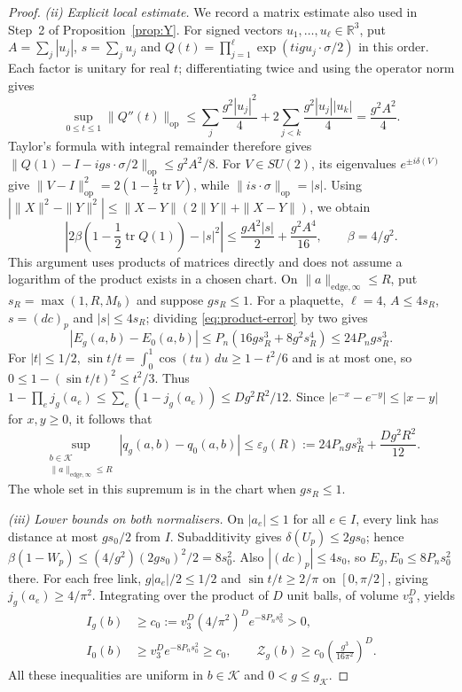 \documentclass[11pt,a4paper]{article}
\theoremstyle{plain}
\theoremstyle{definition}
\theoremstyle{remark}
\numberwithin{equation}{section}
\newcommand{\R}{\mathbb{R}}
\newcommand{\tr}{\operatorname{tr}}
\begin{document}
\begin{proof}
\emph{(ii) Explicit local estimate.}
We record a matrix estimate also used in Step~2 of Proposition~\ref{prop:Y}.
For signed vectors $u_1,\ldots,u_\ell\in\R^3$, put
$A=\sum_j|u_j|$, $s=\sum_j u_j$ and $Q(t)=\prod_{j=1}^\ell\exp(tig u_j\cdot\sigma/2)$ in this order.
Each factor is unitary for real $t$; differentiating twice and using the operator norm gives
\[
\sup_{0\le t\le1}\|Q''(t)\|_{\mathrm{op}}
\le\sum_j\frac{g^2|u_j|^2}{4}
       +2\sum_{j<k}\frac{g^2|u_j||u_k|}{4}
=\frac{g^2A^2}{4}.
\]
Taylor's formula with integral remainder therefore gives
$\|Q(1)-I-ig s\cdot\sigma/2\|_{\mathrm{op}}\le g^2A^2/8$.
For $V\in SU(2)$, its eigenvalues $e^{\pm i\delta(V)}$ give
$\|V-I\|_{\mathrm{op}}^2=2(1-\frac12\tr V)$, while $\|is\cdot\sigma\|_{\mathrm{op}}=|s|$.
Using $|\|X\|^2-\|Y\|^2|\le\|X-Y\|(2\|Y\|+\|X-Y\|)$, we obtain
\begin{equation*}\tag{S.2}\label{eq:product-error}
\left|2\beta\left(1-\frac12\tr Q(1)\right)-|s|^2\right|
\le\frac{gA^2|s|}{2}+\frac{g^2A^4}{16},\qquad \beta=4/g^2.
\end{equation*}
This argument uses products of matrices directly and does not assume a logarithm of the product exists in a chosen chart.
On $\|a\|_{\mathrm{edge},\infty}\le R$, put $s_R=\max(1,R,M_b)$ and suppose $gs_R\le1$.
For a plaquette, $\ell=4$, $A\le4s_R$, $s=(dc)_p$ and $|s|\le4s_R$; dividing \eqref{eq:product-error} by two gives
\[
|E_g(a,b)-E_0(a,b)|\le P_n(16gs_R^3+8g^2s_R^4)\le24P_n gs_R^3.
\]
For $|t|\le1/2$, $\sin t/t=\int_0^1\cos(tu)\,du\ge1-t^2/6$ and is at most one, so
$0\le1-(\sin t/t)^2\le t^2/3$. Thus $1-\prod_e j_g(a_e)\le\sum_e(1-j_g(a_e))\le Dg^2R^2/12$.
Since $|e^{-x}-e^{-y}|\le|x-y|$ for $x,y\ge0$, it follows that
\begin{equation*}\tag{S.3}\label{eq:S-local}
\sup_{\substack{b\in\mathcal K\\\|a\|_{\mathrm{edge},\infty}\le R}}
|q_g(a,b)-q_0(a,b)|\le\varepsilon_g(R):=24P_n gs_R^3+\frac{Dg^2R^2}{12}.
\end{equation*}
The whole set in this supremum is in the chart when $gs_R\le1$.

\emph{(iii) Lower bounds on both normalisers.}
On $|a_e|\le1$ for all $e\in I$, every link has distance at most $gs_0/2$ from $I$.
Subadditivity gives $\delta(U_p)\le2gs_0$; hence
$\beta(1-W_p)\le(4/g^2)(2gs_0)^2/2=8s_0^2$.
Also $|(dc)_p|\le4s_0$, so $E_g,E_0\le8P_ns_0^2$ there.
For each free link, $g|a_e|/2\le1/2$ and $\sin t/t\ge2/\pi$ on $[0,\pi/2]$, giving $j_g(a_e)\ge4/\pi^2$.
Integrating over the product of $D$ unit balls, of volume $v_3^D$, yields
\begin{equation*}\tag{S.4}\label{eq:S-normaliser}
\begin{split}
I_g(b)&\ge c_0:=v_3^D(4/\pi^2)^D e^{-8P_ns_0^2}>0,\\
I_0(b)&\ge v_3^D e^{-8P_ns_0^2}\ge c_0,
\qquad \mathcal Z_g(b)\ge c_0\left(\frac{g^3}{16\pi^2}\right)^D.
\end{split}
\end{equation*}
All these inequalities are uniform in $b\in\mathcal K$ and $0<g\le g_{\mathcal K}$.


\end{proof}
\end{document}
